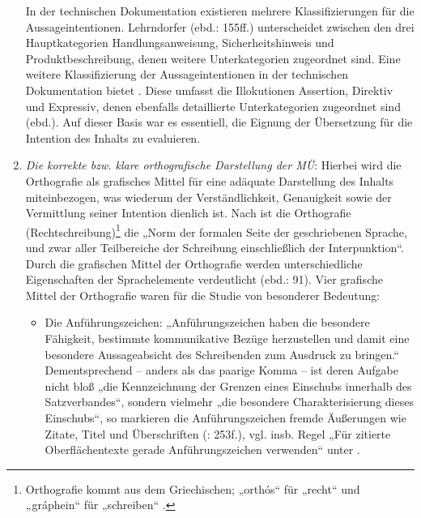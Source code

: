 \begin{enumerate}[label={(\arabic*)}, align=left]
In der technischen Dokumentation existieren mehrere Klassifizierungen für die Aussageintentionen. Lehrndorfer (ebd.: 155ff.) unterscheidet zwischen den drei Hauptkategorien Handlungsanweisung, Sicherheitshinweis und Produktbeschreibung, denen weitere Unterkategorien zugeordnet sind. Eine weitere Klassifizierung der Aussageintentionen in der technischen Dokumentation bietet \citet[110ff.]{Ley2005}. Diese umfasst die Illokutionen Assertion, Direktiv und Expressiv, denen ebenfalls detaillierte Unterkategorien zugeordnet sind (ebd.). Auf dieser Basis war es essentiell, die Eignung der Übersetzung für die Intention des Inhalts zu evaluieren.

\item
\textit{Die korrekte bzw. klare orthografische Darstellung der MÜ}: Hierbei wird die Orthografie als grafisches Mittel für eine adäquate Darstellung des Inhalts miteinbezogen, was wiederum der Verständlichkeit, Genauigkeit sowie der Vermittlung seiner Intention dienlich ist. Nach \citet[30f.]{Nerius2007} ist die Orthografie (Rechtschreibung)\footnote{{Orthografie kommt aus dem Griechischen; „orthós“ für „recht“ und „gráphein“ für „schreiben“ \citep[30]{Nerius2007}.}} die „Norm der formalen Seite der geschriebenen Sprache, und zwar aller Teilbereiche der Schreibung einschließlich der Interpunktion“. Durch die grafischen Mittel der Orthografie werden unterschiedliche Eigenschaften der Sprachelemente verdeutlicht (ebd.: 91). Vier grafische Mittel der Orthografie waren für die Studie von besonderer Bedeutung:
    \begin{itemize}
    \item    Die Anführungszeichen: „Anführungszeichen haben die besondere Fähigkeit, bestimmte kommunikative Bezüge herzustellen und damit eine besondere Aussageabsicht des Schreibenden zum Ausdruck zu bringen.“ Dementsprechend -- anders als das paarige Komma -- ist deren Aufgabe nicht bloß „die Kennzeichnung der Grenzen eines Einschubs innerhalb des Satzverbandes“, sondern vielmehr „die besondere Charakterisierung dieses Einschubs“, so markieren die Anführungszeichen fremde Äußerungen wie Zitate, Titel und Überschriften (\citealt{Nerius2007}: 253f.), vgl. insb. Regel „Für zitierte Oberflächentexte gerade Anführungszeichen verwenden“ unter .

\end{itemize}
\end{enumerate}
